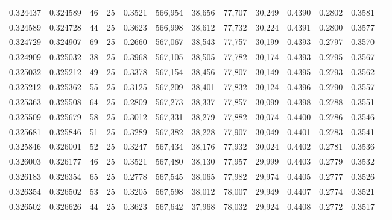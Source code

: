 \begin{tabular}{rrrrrrrrrrrrr}
0.324437 & 0.324589 &    46 &  25 &                                     0.3521 & 566,954 &  38,656 &  77,707 &  30,249 & 0.4390 & 0.2802 & 0.3581 \\
0.324589 & 0.324728 &    44 &  25 &                                     0.3623 & 566,998 &  38,612 &  77,732 &  30,224 & 0.4391 & 0.2800 & 0.3577 \\
0.324729 & 0.324907 &    69 &  25 &                                     0.2660 & 567,067 &  38,543 &  77,757 &  30,199 & 0.4393 & 0.2797 & 0.3570 \\
0.324909 & 0.325032 &    38 &  25 &                                     0.3968 & 567,105 &  38,505 &  77,782 &  30,174 & 0.4393 & 0.2795 & 0.3567 \\
0.325032 & 0.325212 &    49 &  25 &                                     0.3378 & 567,154 &  38,456 &  77,807 &  30,149 & 0.4395 & 0.2793 & 0.3562 \\
0.325212 & 0.325362 &    55 &  25 &                                     0.3125 & 567,209 &  38,401 &  77,832 &  30,124 & 0.4396 & 0.2790 & 0.3557 \\
0.325363 & 0.325508 &    64 &  25 &                                     0.2809 & 567,273 &  38,337 &  77,857 &  30,099 & 0.4398 & 0.2788 & 0.3551 \\
0.325509 & 0.325679 &    58 &  25 &                                     0.3012 & 567,331 &  38,279 &  77,882 &  30,074 & 0.4400 & 0.2786 & 0.3546 \\
0.325681 & 0.325846 &    51 &  25 &                                     0.3289 & 567,382 &  38,228 &  77,907 &  30,049 & 0.4401 & 0.2783 & 0.3541 \\
0.325846 & 0.326001 &    52 &  25 &                                     0.3247 & 567,434 &  38,176 &  77,932 &  30,024 & 0.4402 & 0.2781 & 0.3536 \\
0.326003 & 0.326177 &    46 &  25 &                                     0.3521 & 567,480 &  38,130 &  77,957 &  29,999 & 0.4403 & 0.2779 & 0.3532 \\
0.326183 & 0.326354 &    65 &  25 &                                     0.2778 & 567,545 &  38,065 &  77,982 &  29,974 & 0.4405 & 0.2777 & 0.3526 \\
0.326354 & 0.326502 &    53 &  25 &                                     0.3205 & 567,598 &  38,012 &  78,007 &  29,949 & 0.4407 & 0.2774 & 0.3521 \\
0.326502 & 0.326626 &    44 &  25 &                                     0.3623 & 567,642 &  37,968 &  78,032 &  29,924 & 0.4408 & 0.2772 & 0.3517 \\

\end{tabular}
